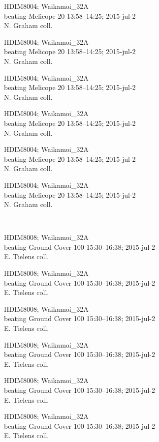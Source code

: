 \documentclass[2pt]{extarticle}
\begin{document}
\noindent
\parbox{0.16\textwidth}{\tiny \raggedright \rule[-0.3\baselineskip]{0pt}{10pt}HDIM8004; Waikamoi\_32A\\ beating Melicope 20 13:58--14:25; 2015-jul-2\\ N. Graham coll.}
\parbox{0.16\textwidth}{\tiny \raggedright \rule[-0.3\baselineskip]{0pt}{10pt}HDIM8004; Waikamoi\_32A\\ beating Melicope 20 13:58--14:25; 2015-jul-2\\ N. Graham coll.}
\parbox{0.16\textwidth}{\tiny \raggedright \rule[-0.3\baselineskip]{0pt}{10pt}HDIM8004; Waikamoi\_32A\\ beating Melicope 20 13:58--14:25; 2015-jul-2\\ N. Graham coll.}
\parbox{0.16\textwidth}{\tiny \raggedright \rule[-0.3\baselineskip]{0pt}{10pt}HDIM8004; Waikamoi\_32A\\ beating Melicope 20 13:58--14:25; 2015-jul-2\\ N. Graham coll.}
\parbox{0.16\textwidth}{\tiny \raggedright \rule[-0.3\baselineskip]{0pt}{10pt}HDIM8004; Waikamoi\_32A\\ beating Melicope 20 13:58--14:25; 2015-jul-2\\ N. Graham coll.}
\parbox{0.16\textwidth}{\tiny \raggedright \rule[-0.3\baselineskip]{0pt}{10pt}HDIM8004; Waikamoi\_32A\\ beating Melicope 20 13:58--14:25; 2015-jul-2\\ N. Graham coll.} \\ 
\vspace{0.001in} 

\noindent
\parbox{0.16\textwidth}{\tiny \raggedright \rule[-0.3\baselineskip]{0pt}{10pt}HDIM8008; Waikamoi\_32A\\ beating Ground Cover 100 15:30--16:38; 2015-jul-2\\ E. Tielens coll.}
\parbox{0.16\textwidth}{\tiny \raggedright \rule[-0.3\baselineskip]{0pt}{10pt}HDIM8008; Waikamoi\_32A\\ beating Ground Cover 100 15:30--16:38; 2015-jul-2\\ E. Tielens coll.}
\parbox{0.16\textwidth}{\tiny \raggedright \rule[-0.3\baselineskip]{0pt}{10pt}HDIM8008; Waikamoi\_32A\\ beating Ground Cover 100 15:30--16:38; 2015-jul-2\\ E. Tielens coll.}
\parbox{0.16\textwidth}{\tiny \raggedright \rule[-0.3\baselineskip]{0pt}{10pt}HDIM8008; Waikamoi\_32A\\ beating Ground Cover 100 15:30--16:38; 2015-jul-2\\ E. Tielens coll.}
\parbox{0.16\textwidth}{\tiny \raggedright \rule[-0.3\baselineskip]{0pt}{10pt}HDIM8008; Waikamoi\_32A\\ beating Ground Cover 100 15:30--16:38; 2015-jul-2\\ E. Tielens coll.}
\parbox{0.16\textwidth}{\tiny \raggedright \rule[-0.3\baselineskip]{0pt}{10pt}HDIM8008; Waikamoi\_32A\\ beating Ground Cover 100 15:30--16:38; 2015-jul-2\\ E. Tielens coll.} \\ 
\vspace{0.001in} 
\end{document}
